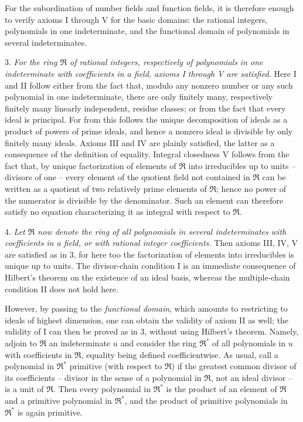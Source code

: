 \documentclass[11pt]{article}
\providecommand{\mR}{\mathfrak{R}}
\begin{document}
For the subordination of number fields and function fields, it is therefore enough to verify axioms I through V for the basic domains: the rational integers, polynomials in one indeterminate, and the functional domain of polynomials in several indeterminates.

3. \emph{For the ring $\mR$ of rational integers, respectively of polynomials in one indeterminate with coefficients in a field, axioms I through V are satisfied.} Here I and II follow either from the fact that, modulo any nonzero number or any such polynomial in one indeterminate, there are only finitely many, respectively finitely many linearly independent, residue classes; or from the fact that every ideal is principal. For from this follows the unique decomposition of ideals as a product of powers of prime ideals, and hence a nonzero ideal is divisible by only finitely many ideals. Axioms III and IV are plainly satisfied, the latter as a consequence of the definition of equality. Integral closedness V follows from the fact that, by unique factorization of elements of $\mR$ into irreducibles up to units -- divisors of one -- every element of the quotient field not contained in $\mR$ can be written as a quotient of two relatively prime elements of $\mR$; hence no power of the numerator is divisible by the denominator. Such an element can therefore satisfy no equation characterizing it as integral with respect to $\mR$.

4. \emph{Let $\mR$ now denote the ring of all polynomials in several indeterminates with coefficients in a field, or with rational integer coefficients.} Then axioms III, IV, V are satisfied as in 3, for here too the factorization of elements into irreducibles is unique up to units. The divisor-chain condition I is an immediate consequence of Hilbert's theorem on the existence of an ideal basis, whereas the multiple-chain condition II does not hold here.

However, by passing to the \emph{functional domain}, which amounts to restricting to ideals of highest dimension, one can obtain the validity of axiom II as well; the validity of I can then be proved as in 3, without using Hilbert's theorem. Namely, adjoin to $\mR$ an indeterminate $u$ and consider the ring $\mR^*$ of all polynomials in $u$ with coefficients in $\mR$, equality being defined coefficientwise. As usual, call a polynomial in $\mR^*$ primitive (with respect to $\mR$) if the greatest common divisor of its coefficients -- divisor in the sense of a polynomial in $\mR$, not an ideal divisor -- is a unit of $\mR$. Then every polynomial in $\mR^*$ is the product of an element of $\mR$ and a primitive polynomial in $\mR^*$, and the product of primitive polynomials in $\mR^*$ is again primitive.
\end{document}
